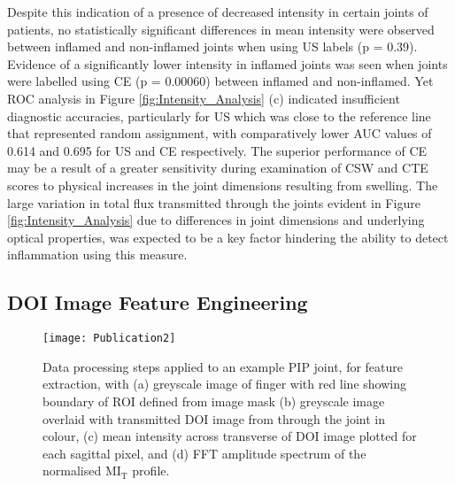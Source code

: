 \documentclass[twoside]{bhamthesis}
\theoremstyle{definition}
\begin{document}
Despite this indication of a presence of decreased intensity in certain joints of patients, no statistically significant differences in mean intensity were observed between inflamed and non-inflamed joints when using US labels (p = 0.39). Evidence of a significantly lower intensity in inflamed joints was seen when joints were labelled using CE (p = 0.00060) between inflamed and non-inflamed. Yet ROC analysis in Figure \ref{fig:Intensity_Analysis} (c) indicated insufficient diagnostic accuracies, particularly for US which was close to the reference line that represented random assignment, with comparatively lower AUC values of 0.614 and 0.695 for US and CE respectively. The superior performance of CE may be a result of a greater sensitivity during examination of CSW and CTE scores to physical increases in the joint dimensions resulting from swelling. The large variation in total flux transmitted through the joints evident in Figure \ref{fig:Intensity_Analysis} due to differences in joint dimensions and underlying optical properties, was expected to be a key factor hindering the ability to detect inflammation using this measure.


\subsection{DOI Image Feature Engineering}
\label{DOI Image Feature Engineering}

\begin{figure}[!ht]
\centering
  \texttt{[image: Publication2]}
\caption{Data processing steps applied to an example PIP joint, for feature extraction, with (a) greyscale image of finger with red line showing boundary of ROI defined from image mask (b) greyscale image overlaid with transmitted DOI image from through the joint in colour, (c) mean intensity across transverse of DOI image plotted for each sagittal pixel, and (d) FFT amplitude spectrum of the normalised $\mathrm{MI_T}$ profile.}
\label{fig:Feature_extraction}
\end{figure}
\end{document}
